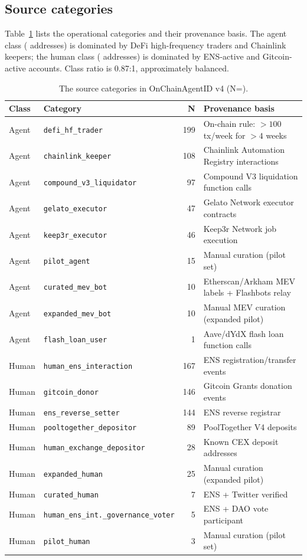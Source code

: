 \documentclass[10pt]{article}
\begin{document}
\subsection{Source categories}

Table~\ref{tab:sources} lists the \datasetNCategories{} operational categories and their provenance basis. The agent class (\datasetNAgents{} addresses) is dominated by DeFi high-frequency traders and Chainlink keepers; the human class (\datasetNHumans{} addresses) is dominated by ENS-active and Gitcoin-active accounts. Class ratio is 0.87:1, approximately balanced.

\begin{table}[h]
\centering
\small
\caption{The \datasetNCategories{} source categories in OnChainAgentID v4 (N=\datasetNAddresses{}).}
\label{tab:sources}
\begin{tabular}{llrl}
\toprule
Class & Category & N & Provenance basis \\
\midrule
Agent & \texttt{defi\_hf\_trader} & 199 & On-chain rule: $>100$ tx/week for $>4$ weeks \\
Agent & \texttt{chainlink\_keeper} & 108 & Chainlink Automation Registry interactions \\
Agent & \texttt{compound\_v3\_liquidator} & 97 & Compound V3 liquidation function calls \\
Agent & \texttt{gelato\_executor} & 47 & Gelato Network executor contracts \\
Agent & \texttt{keep3r\_executor} & 46 & Keep3r Network job execution \\
Agent & \texttt{pilot\_agent} & 15 & Manual curation (pilot set) \\
Agent & \texttt{curated\_mev\_bot} & 10 & Etherscan/Arkham MEV labels + Flashbots relay \\
Agent & \texttt{expanded\_mev\_bot} & 10 & Manual MEV curation (expanded pilot) \\
Agent & \texttt{flash\_loan\_user} & 1 & Aave/dYdX flash loan function calls \\
\midrule
Human & \texttt{human\_ens\_interaction} & 167 & ENS registration/transfer events \\
Human & \texttt{gitcoin\_donor} & 146 & Gitcoin Grants donation events \\
Human & \texttt{ens\_reverse\_setter} & 144 & ENS reverse registrar \\
Human & \texttt{pooltogether\_depositor} & 89 & PoolTogether V4 deposits \\
Human & \texttt{human\_exchange\_depositor} & 28 & Known CEX deposit addresses \\
Human & \texttt{expanded\_human} & 25 & Manual curation (expanded pilot) \\
Human & \texttt{curated\_human} & 7 & ENS + Twitter verified \\
Human & \texttt{human\_ens\_int.\_governance\_voter} & 5 & ENS + DAO vote participant \\
Human & \texttt{pilot\_human} & 3 & Manual curation (pilot set) \\
\bottomrule
\end{tabular}
\end{table}
\end{document}
